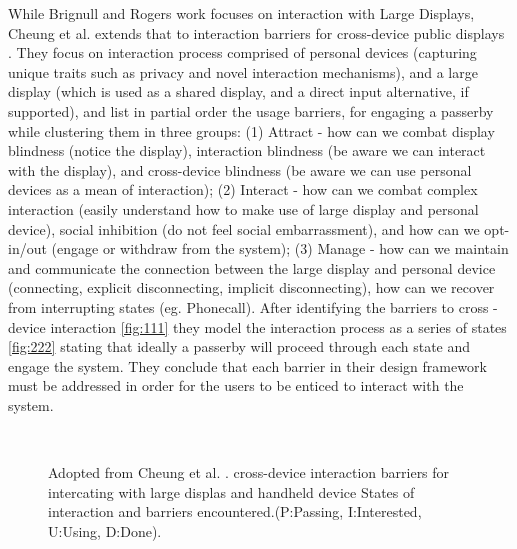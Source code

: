 While Brignull and Rogers work focuses on interaction with Large Displays, Cheung et al.  extends that to interaction barriers for cross-device public displays \cite{Cheung:2014}. They focus on interaction process comprised of personal devices (capturing unique traits such as privacy and novel interaction mechanisms), and a large display (which is used as a shared display, and a direct input alternative, if supported), and list in partial order the usage barriers, for engaging a passerby while clustering them in three groups: (1) Attract - how can we combat display blindness (notice the display), interaction blindness (be aware we can interact with the display), and cross-device blindness (be aware we can use personal devices as a mean of interaction); (2) Interact - how can we combat complex interaction (easily understand how to make use of large display and personal device), social inhibition (do not feel social embarrassment),  and how can we opt-in/out (engage or withdraw from the system); (3) Manage - how can we maintain and communicate the connection between the large display and personal device (connecting, explicit disconnecting, implicit disconnecting), how can we recover from interrupting states (eg. Phonecall). After identifying the barriers to cross - device interaction \ref{fig:111} they model the interaction process as a series of states \ref{fig:222} stating that ideally a passerby will proceed through each state and engage the system. They conclude that each barrier in their design framework must be addressed in order for the users to be enticed to interact with the system.


\begin{figure}[H]
	\centering
	\\ 
	\caption{
		Adopted from Cheung et al. \protect\cite{Cheung:2014}.
		\protect{} cross-device interaction barriers for intercating with large displas and handheld device
		\protect{} States  of interaction and barriers encountered.(P:Passing, I:Interested, U:Using, D:Done).
		}
	\label{fig:Cheung et al. ideas}
\end{figure}

